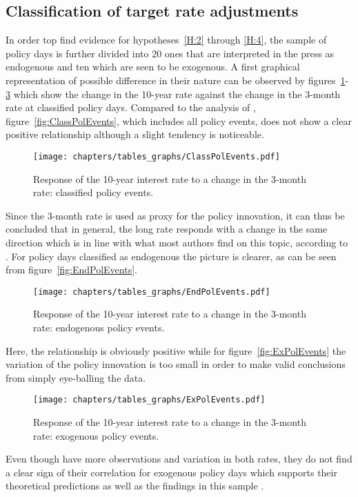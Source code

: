 \subsection{Classification of target rate adjustments}

In order top find evidence for hypotheses~\ref{H:2} through \ref{H:4}, the sample of policy days is further divided into 20 ones that are interpreted in the press as endogenous and ten which are seen to be exogenous. A first graphical representation of possible difference in their nature can be observed by figures~\ref{fig:ClassPolEvents}-\ref{fig:ExPolEvents} which show the change in the 10-year rate against the change in the 3-month rate at classified policy days. Compared to the analysis of \textcite{Ellingsen.2003}, figure~\vref{fig:ClassPolEvents}, which includes all policy events, does not show a clear positive relationship although a slight tendency is noticeable. 
\begin{figure}[htbp]
	\centering
	\texttt{[image: chapters/tables\_graphs/ClassPolEvents.pdf]} 
	\caption{Response of the 10-year interest rate to a change in the 3-month rate: classified policy events.}
	\label{fig:ClassPolEvents}
\end{figure}
%
Since the 3-month rate is used as proxy for the policy innovation, it can thus be concluded that in general, the long rate responds with a change in the same direction which is in line with what most authors find on this topic, according to \textcite{Ellingsen.2003}. For policy days classified as endogenous the picture is clearer, as can be seen from figure~\vref{fig:EndPolEvents}.
\begin{figure}[htbp]
	\centering
	\texttt{[image: chapters/tables\_graphs/EndPolEvents.pdf]} 
	\caption{Response of the 10-year interest rate to a change in the 3-month rate: endogenous policy events.}
	\label{fig:EndPolEvents}
\end{figure}
%
Here, the relationship is obviously positive while for figure~\vref{fig:ExPolEvents} the variation of the policy innovation is too small in order to make valid conclusions from simply eye-balling the data.
\begin{figure}[htbp]
	\centering
	\texttt{[image: chapters/tables\_graphs/ExPolEvents.pdf]} 
	\caption{Response of the 10-year interest rate to a change in the 3-month rate: exogenous policy events.}
	\label{fig:ExPolEvents}
\end{figure}
%
Even though \textcite{Ellingsen.2003} have more observations and variation in both rates, they do not find a clear sign of their correlation for exogenous policy days which supports their theoretical predictions as well as the findings in this sample . 


